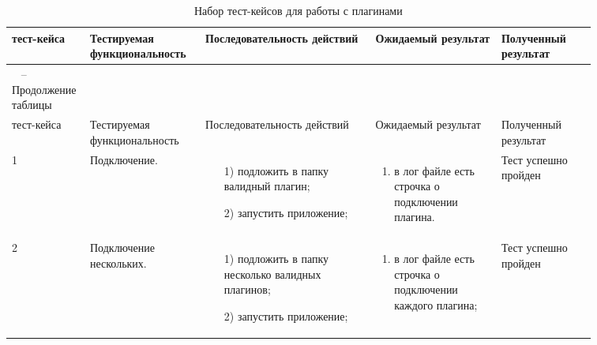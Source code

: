 \begin{longtable}{| >{\raggedright}m{0.06\linewidth} 
                  | >{\raggedright}m{0.18\linewidth} 
                  | >{\raggedright}m{0.27\linewidth} 
                  | >{\raggedright}m{0.2\linewidth} 
                  | >{\raggedright\arraybackslash}m{0.15\linewidth}|}
	\caption{Набор тест-кейсов для работы с плагинами}
	\label{table:testing:marketplace} \\

   \hline
   \No{} тест-кейса & Тестируемая функциональность & Последовательность действий & Ожидаемый результат & Полученный результат\\
   \endfirsthead

	\multicolumn{3}{c}%
	{{ \raggedleft \tablename\ \thetable{} -- Продолжение таблицы}} \\

	\hline
   	\No{} тест-кейса & Тестируемая функциональность & Последовательность действий & Ожидаемый результат & Полученный результат\\

	\hline 
	\endhead

	\hline
	1 & Подключение. & 
   			\begin{enumerate}
				\item[1)] подложить в папку \pluginFolder{} валидный плагин;
				\item[2)] запустить приложение;
			\end{enumerate}
   			& 
   			\begin{enumerate}
   				\item в лог файле есть строчка о подключении плагина.
   			\end{enumerate}
   			& Тест успешно пройден \\
	\hline
	2 & Подключение нескольких.  & 
   			\begin{enumerate}
				\item[1)] подложить в папку \pluginFolder{} несколько валидных плагинов;
				\item[2)] запустить приложение;
			\end{enumerate}
   			& 
   			\begin{enumerate}
   				\item в лог файле есть строчка о подключении каждого плагина;
   			\end{enumerate}
   			& Тест успешно пройден \\ 


\end{longtable}
